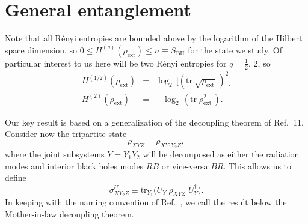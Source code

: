 \documentclass[aps,12pt]{revtex4}
\begin{document}
\section{General entanglement}
\label{decoupling}

Note that all R\'enyi entropies are bounded above by the logarithm of
the Hilbert space dimension, so
 $0\le H^{(q)}(\rho_{\text{ext}})\le n\equiv S_{\text{BH}}$
for the state we study. Of particular interest to us here will be two
R\'enyi entropies for $q=\frac{1}{2}$, $2$, so
\begin{eqnarray}
H^{(1/2)}(\rho_{\text{ext}}) &=&\log_2
 \,\bigl[({\text{tr}}\;\sqrt{\rho_{\text{ext}}}\,)^2\bigr] \nonumber \\
H^{(2)}(\rho_{\text{ext}}) &=&-\log_2
\,({\text{tr}}\;{\rho^2_{\text{ext}}}\,).
\end{eqnarray}

Our key result is based on a generalization of the decoupling theorem of
Ref.~11. Consider now the tripartite state
\begin{equation}
\rho_{XYZ}^{\text{~}}=
\rho_{XY_1Y_2Z}^{\text{~}},
\end{equation}
where the joint subsystems $Y=Y_1Y_2$ will be decomposed as either
the radiation modes and interior black holes modes $RB$ or vice-versa
$BR$. This allows us to define
\begin{equation}
\sigma_{XY_2Z}^U\equiv
\text{tr}_{Y_1}^{\text{~}} \bigl(U_{Y}\;
\rho_{XYZ}^{\text{~}}\; U_{Y}^\dagger\bigr).
\end{equation}
In keeping with the naming convention of Ref.~,
we call the result
below the Mother-in-law decoupling theorem.

\end{document}
